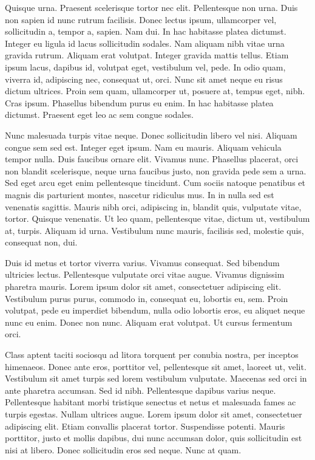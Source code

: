 Quisque urna. Praesent scelerisque tortor nec elit. Pellentesque non
urna. Duis non sapien id nunc rutrum facilisis. Donec lectus ipsum,
ullamcorper vel, sollicitudin a, tempor a, sapien. Nam dui. In hac
habitasse platea dictumst. Integer eu ligula id lacus sollicitudin
sodales. Nam aliquam nibh vitae urna gravida rutrum. Aliquam erat
volutpat. Integer gravida mattis tellus. Etiam ipsum lacus, dapibus
id, volutpat eget, vestibulum vel, pede. In odio quam, viverra id,
adipiscing nec, consequat ut, orci. Nunc sit amet neque eu risus
dictum ultrices. Proin sem quam, ullamcorper ut, posuere at, tempus
eget, nibh. Cras ipsum. Phasellus bibendum purus eu enim. In hac
habitasse platea dictumst. Praesent eget leo ac sem congue sodales.

Nunc malesuada turpis vitae neque. Donec sollicitudin libero vel
nisi. Aliquam congue sem sed est. Integer eget ipsum. Nam eu
mauris. Aliquam vehicula tempor nulla. Duis faucibus ornare
elit. Vivamus nunc. Phasellus placerat, orci non blandit scelerisque,
neque urna faucibus justo, non gravida pede sem a urna. Sed eget arcu
eget enim pellentesque tincidunt. Cum sociis natoque penatibus et
magnis dis parturient montes, nascetur ridiculus mus. In in nulla sed
est venenatis sagittis. Mauris nibh orci, adipiscing in, blandit quis,
vulputate vitae, tortor. Quisque venenatis. Ut leo quam, pellentesque
vitae, dictum ut, vestibulum at, turpis. Aliquam id urna. Vestibulum
nunc mauris, facilisis sed, molestie quis, consequat non, dui.

Duis id metus et tortor viverra varius. Vivamus consequat. Sed
bibendum ultricies lectus. Pellentesque vulputate orci vitae
augue. Vivamus dignissim pharetra mauris. Lorem ipsum dolor sit amet,
consectetuer adipiscing elit. Vestibulum purus purus, commodo in,
consequat eu, lobortis eu, sem. Proin volutpat, pede eu imperdiet
bibendum, nulla odio lobortis eros, eu aliquet neque nunc eu
enim. Donec non nunc. Aliquam erat volutpat. Ut cursus fermentum orci.

Class aptent taciti sociosqu ad litora torquent per conubia nostra,
per inceptos himenaeos. Donec ante eros, porttitor vel, pellentesque
sit amet, laoreet ut, velit. Vestibulum sit amet turpis sed lorem
vestibulum vulputate. Maecenas sed orci in ante pharetra accumsan. Sed
id nibh. Pellentesque dapibus varius neque. Pellentesque habitant
morbi tristique senectus et netus et malesuada fames ac turpis
egestas. Nullam ultrices augue. Lorem ipsum dolor sit amet,
consectetuer adipiscing elit. Etiam convallis placerat
tortor. Suspendisse potenti. Mauris porttitor, justo et mollis
dapibus, dui nunc accumsan dolor, quis sollicitudin est nisi at
libero. Donec sollicitudin eros sed neque. Nunc at quam.


